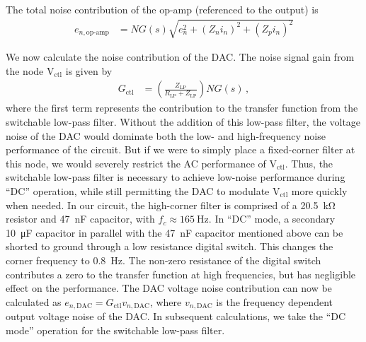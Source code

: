 \documentclass[aip,rsi,reprint]{revtex4-1} %
\begin{document}
The total noise contribution of the op-amp (referenced to the output) is
\begin{align}
\label{Eq:OpAmpNoise}
e_{n,\text{op-amp}} &= NG(s)\sqrt{e_n^2 + (Z_n i_n)^2 + (Z_p i_n)^2}
\end{align}

We now calculate the noise contribution of the DAC.
The noise signal gain from the node $\text{V}_{\text{ctl}}$ is given by
\begin{align}
\label{Eq:Gdc}
G_{\text{ctl}} &= \left(\frac{Z_\text{LP}}{R_\text{LP} + Z_\text{LP}}\right)NG(s)\,,
\end{align}
where the first term represents the contribution to the transfer function from the switchable low-pass filter.
Without the addition of this low-pass filter, the voltage noise of the DAC would dominate both the low- and high-frequency noise performance of the circuit.
But if we were to simply place a fixed-corner filter at this node, we would severely restrict the AC performance of $\text{V}_\text{ctl}$.
Thus, the switchable low-pass filter is necessary to achieve low-noise performance during ``DC'' operation, while still permitting the DAC to modulate $\text{V}_\text{ctl}$ more quickly when needed.
In our circuit, the high-corner filter is comprised of a \SI{20.5}{\kilo\ohm} resistor and \SI{47}{\nano\farad} capacitor, with $f_c \approx \SI{165}{\hertz}$.
In ``DC'' mode, a secondary \SI{10}{\micro\farad} capacitor in parallel with the \SI{47}{\nano\farad} capacitor mentioned above can be shorted to ground through a low resistance digital switch.
This changes the corner frequency to \SI{0.8}{\hertz}.
The non-zero resistance of the digital switch contributes a zero to the transfer function at high frequencies, but has negligible effect on the performance.
The DAC voltage noise contribution can now be calculated as $e_{n,\text{DAC}} = G_{\text{ctl}} v_{n,\text{DAC}}$, where $v_{n,\text{DAC}}$ is the frequency dependent output voltage noise of the DAC. 
In subsequent calculations, we take the ``DC mode'' operation for the switchable low-pass filter.
\end{document}
